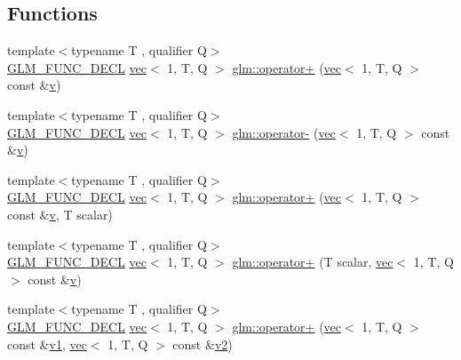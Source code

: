 \subsection*{Functions}
\begin{DoxyCompactItemize}
\item 
{\footnotesize template$<$typename T , qualifier Q$>$ }\\\hyperlink{setup_8hpp_ab2d052de21a70539923e9bcbf6e83a51}{G\+L\+M\+\_\+\+F\+U\+N\+C\+\_\+\+D\+E\+CL} \hyperlink{structglm_1_1vec}{vec}$<$ 1, T, Q $>$ \hyperlink{group__ext__vec1_gac2cf4da0dc267f31db88de168ea3169b}{glm\+::operator+} (\hyperlink{structglm_1_1vec}{vec}$<$ 1, T, Q $>$ const \&\hyperlink{_s_d_l__opengl_8h_a10a82eabcb59d2fcd74acee063775f90}{v})
\item 
{\footnotesize template$<$typename T , qualifier Q$>$ }\\\hyperlink{setup_8hpp_ab2d052de21a70539923e9bcbf6e83a51}{G\+L\+M\+\_\+\+F\+U\+N\+C\+\_\+\+D\+E\+CL} \hyperlink{structglm_1_1vec}{vec}$<$ 1, T, Q $>$ \hyperlink{group__ext__vec1_gad2032db9362999ab1c27aae09816c9fd}{glm\+::operator-\/} (\hyperlink{structglm_1_1vec}{vec}$<$ 1, T, Q $>$ const \&\hyperlink{_s_d_l__opengl_8h_a10a82eabcb59d2fcd74acee063775f90}{v})
\item 
{\footnotesize template$<$typename T , qualifier Q$>$ }\\\hyperlink{setup_8hpp_ab2d052de21a70539923e9bcbf6e83a51}{G\+L\+M\+\_\+\+F\+U\+N\+C\+\_\+\+D\+E\+CL} \hyperlink{structglm_1_1vec}{vec}$<$ 1, T, Q $>$ \hyperlink{group__ext__vec1_ga00b4b51068bde0730a3ed9ebeb254a24}{glm\+::operator+} (\hyperlink{structglm_1_1vec}{vec}$<$ 1, T, Q $>$ const \&\hyperlink{_s_d_l__opengl_8h_a10a82eabcb59d2fcd74acee063775f90}{v}, T scalar)
\item 
{\footnotesize template$<$typename T , qualifier Q$>$ }\\\hyperlink{setup_8hpp_ab2d052de21a70539923e9bcbf6e83a51}{G\+L\+M\+\_\+\+F\+U\+N\+C\+\_\+\+D\+E\+CL} \hyperlink{structglm_1_1vec}{vec}$<$ 1, T, Q $>$ \hyperlink{group__ext__vec1_ga9ce1879778cf852a8e5853db26138110}{glm\+::operator+} (T scalar, \hyperlink{structglm_1_1vec}{vec}$<$ 1, T, Q $>$ const \&\hyperlink{_s_d_l__opengl_8h_a10a82eabcb59d2fcd74acee063775f90}{v})
\item 
{\footnotesize template$<$typename T , qualifier Q$>$ }\\\hyperlink{setup_8hpp_ab2d052de21a70539923e9bcbf6e83a51}{G\+L\+M\+\_\+\+F\+U\+N\+C\+\_\+\+D\+E\+CL} \hyperlink{structglm_1_1vec}{vec}$<$ 1, T, Q $>$ \hyperlink{group__ext__vec1_gadbe612a85d5c9d06f29d726d7998a8db}{glm\+::operator+} (\hyperlink{structglm_1_1vec}{vec}$<$ 1, T, Q $>$ const \&\hyperlink{_s_d_l__opengl__glext_8h_a435c176a02c061b43e19bdf7c86cceae}{v1}, \hyperlink{structglm_1_1vec}{vec}$<$ 1, T, Q $>$ const \&\hyperlink{_s_d_l__opengl__glext_8h_a0928f6d0f0f794ba000a21dfae422136}{v2})

\end{DoxyCompactItemize}
